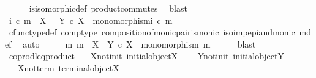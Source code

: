 \begin{isabellebody}
\ \ \ \ \isamarkupfalse%
\ is{\isacharunderscore}{\kern0pt}isomorphic{\isacharunderscore}{\kern0pt}def\ product{\isacharunderscore}{\kern0pt}commutes\ \isamarkupfalse%
\ blast\isanewline
\ \ \isamarkupfalse%
\ \isamarkupfalse%
\ {\isachardoublequoteopen}i\ {\isasymcirc}\isactrlsub c\ m\ {\isacharcolon}{\kern0pt}\ X\ {\isasymrightarrow}\ \ {\isacharparenleft}{\kern0pt}Y\ {\isasymtimes}\isactrlsub c\ X{\isacharparenright}{\kern0pt}\ {\isasymand}\ monomorphism{\isacharparenleft}{\kern0pt}i\ {\isasymcirc}\isactrlsub c\ m{\isacharparenright}{\kern0pt}{\isachardoublequoteclose}\isanewline
\ \ \ \ \isamarkupfalse%
\ cfunc{\isacharunderscore}{\kern0pt}type{\isacharunderscore}{\kern0pt}def\ comp{\isacharunderscore}{\kern0pt}type\ composition{\isacharunderscore}{\kern0pt}of{\isacharunderscore}{\kern0pt}monic{\isacharunderscore}{\kern0pt}pair{\isacharunderscore}{\kern0pt}is{\isacharunderscore}{\kern0pt}monic\ iso{\isacharunderscore}{\kern0pt}imp{\isacharunderscore}{\kern0pt}epi{\isacharunderscore}{\kern0pt}and{\isacharunderscore}{\kern0pt}monic\ m{\isacharunderscore}{\kern0pt}def\ \isamarkupfalse%
\ auto\isanewline
\ \ \isamarkupfalse%
\ \isamarkupfalse%
\ {\isachardoublequoteopen}{\isasymexists}m{\isachardot}{\kern0pt}\ m\ {\isacharcolon}{\kern0pt}\ X\ {\isasymrightarrow}\ Y\ {\isasymtimes}\isactrlsub c\ X\ {\isasymand}\ monomorphism\ m{\isachardoublequoteclose}\isanewline
\ \ \ \ \isamarkupfalse%
\ blast\isanewline
{}\isamarkupfalse%
%
\endisatagproof
{\isafoldproof}%
%
\isadelimproof
\isanewline
%
\endisadelimproof
\isanewline
{}\isamarkupfalse%
\ coprod{\isacharunderscore}{\kern0pt}leq{\isacharunderscore}{\kern0pt}product{\isacharcolon}{\kern0pt}\isanewline
\ \ \ X{\isacharunderscore}{\kern0pt}not{\isacharunderscore}{\kern0pt}init{\isacharcolon}{\kern0pt}\ {\isachardoublequoteopen}{\isasymnot}{\isacharparenleft}{\kern0pt}initial{\isacharunderscore}{\kern0pt}object{\isacharparenleft}{\kern0pt}X{\isacharparenright}{\kern0pt}{\isacharparenright}{\kern0pt}{\isachardoublequoteclose}\ \isanewline
\ \ \ Y{\isacharunderscore}{\kern0pt}not{\isacharunderscore}{\kern0pt}init{\isacharcolon}{\kern0pt}\ {\isachardoublequoteopen}{\isasymnot}{\isacharparenleft}{\kern0pt}initial{\isacharunderscore}{\kern0pt}object{\isacharparenleft}{\kern0pt}Y{\isacharparenright}{\kern0pt}{\isacharparenright}{\kern0pt}{\isachardoublequoteclose}\ \isanewline
\ \ \ X{\isacharunderscore}{\kern0pt}not{\isacharunderscore}{\kern0pt}term{\isacharcolon}{\kern0pt}\ {\isachardoublequoteopen}{\isasymnot}{\isacharparenleft}{\kern0pt}terminal{\isacharunderscore}{\kern0pt}object{\isacharparenleft}{\kern0pt}X{\isacharparenright}{\kern0pt}{\isacharparenright}{\kern0pt}{\isachardoublequoteclose}\isanewline

\end{isabellebody}
